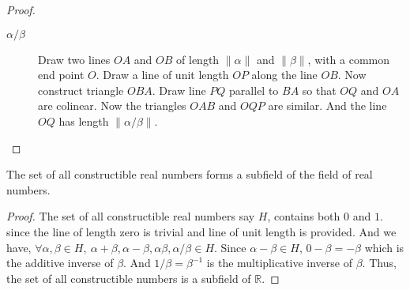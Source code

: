 \begin{proof}
\begin{description}
\begin{center}
\end{center}
	\item[$\alpha/\beta$] Draw two lines $OA$ and $OB$ of length $\| \alpha \|$ and $\| \beta \|$, with a common end point $O$. Draw a line of unit length $OP$ along the line $OB$. Now construct triangle $OBA$. Draw line $PQ$ parallel to $BA$ so that $OQ$ and $OA$ are colinear. Now the triangles $OAB$ and $OQP$ are similar. And the line $OQ$ has length $\| \alpha/\beta \|$.
\begin{center}
\end{center}
\end{description}
\end{proof}

\begin{corollary}
	The set of all constructible real numbers forms a subfield of the field of real numbers.
\end{corollary}
\begin{proof}
	The set of all constructible real numbers say $H$, contains both $0$ and $1$. since the line of length zero is trivial and line of unit length is provided. And we have, $\forall \alpha,\beta \in H,\ \alpha+\beta,\alpha-\beta,\alpha\beta,\alpha/\beta \in H$. Since $\alpha - \beta \in H$, $0-\beta = -\beta$ which is the additive inverse of $\beta$. And $1/\beta = \beta^{-1}$ is the multiplicative inverse of $\beta$. Thus, the set of all constructible numbers is a subfield of $\mathbb{R}$.
\end{proof}

